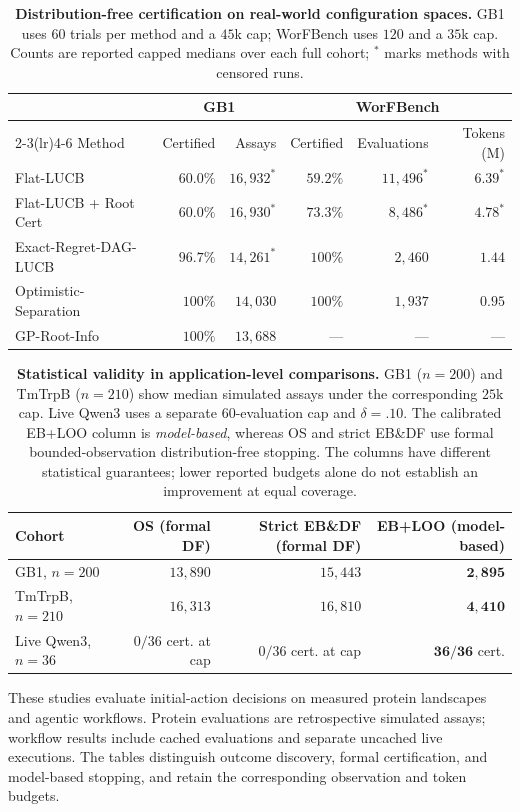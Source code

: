 \documentclass{article}
\theoremstyle{plain}
\theoremstyle{definition}
\begin{document}
\begin{table}[!htbp]
\caption{\textbf{Distribution-free certification on real-world configuration spaces.} GB1 uses $60$ trials per method and a $45$k cap; WorFBench uses $120$ and a $35$k cap. Counts are reported capped medians over each full cohort; $^*$ marks methods with censored runs.}
\label{tab:main-applications}\label{fig:real-world}
\centering\small
\begin{tabular}{@{}lrrrrr@{}}
\toprule
 & \multicolumn{2}{c}{GB1} & \multicolumn{3}{c}{WorFBench}\\
\cmidrule(lr){2-3}\cmidrule(lr){4-6}
Method & Certified & Assays & Certified & Evaluations & Tokens (M)\\
\midrule
Flat-LUCB & $60.0\%$ & $16{,}932^*$ & $59.2\%$ & $11{,}496^*$ & $6.39^*$\\
Flat-LUCB + Root Cert & $60.0\%$ & $16{,}930^*$ & $73.3\%$ & $8{,}486^*$ & $4.78^*$\\
Exact-Regret-DAG-LUCB & $96.7\%$ & $14{,}261^*$ & $100\%$ & $2{,}460$ & $1.44$\\
Optimistic-Separation & $100\%$ & $14{,}030$ & $100\%$ & $1{,}937$ & $0.95$\\
GP-Root-Info & $100\%$ & $13{,}688$ & --- & --- & ---\\
\bottomrule
\end{tabular}
\end{table}

\begin{table}[!htbp]
\centering
\caption{\textbf{Statistical validity in application-level comparisons.} GB1 ($n=200$) and TmTrpB ($n=210$) show median simulated assays under the corresponding $25$k cap. Live Qwen3 uses a separate $60$-evaluation cap and $\delta=.10$. The calibrated EB+LOO column is \emph{model-based}, whereas OS and strict EB\&DF use formal bounded-observation distribution-free stopping. The columns have different statistical guarantees; lower reported budgets alone do not establish an improvement at equal coverage.}
\label{tab:main-validity-contrast}
\small
\renewcommand{\arraystretch}{0.95}
\setlength{\tabcolsep}{4.2pt}
\begin{tabular}{@{}lrrr@{}}
\toprule
\textbf{Cohort} & \textbf{OS (formal DF)} & \textbf{Strict EB\&DF (formal DF)} & \textbf{EB+LOO (model-based)}\\
\midrule
GB1, $n=200$ & $13{,}890$ & $15{,}443$ & $\mathbf{2{,}895}$\\
TmTrpB, $n=210$ & $16{,}313$ & $16{,}810$ & $\mathbf{4{,}410}$\\
Live Qwen3, $n=36$ & $0/36$ cert. at cap & $0/36$ cert. at cap & $\mathbf{36/36}$ cert.\\
\bottomrule
\end{tabular}
\vspace{-8pt}
\end{table}
These studies evaluate initial-action decisions on measured protein landscapes and agentic workflows. Protein evaluations are retrospective simulated assays; workflow results include cached evaluations and separate uncached live executions. The tables distinguish outcome discovery, formal certification, and model-based stopping, and retain the corresponding observation and token budgets.
\end{document}
